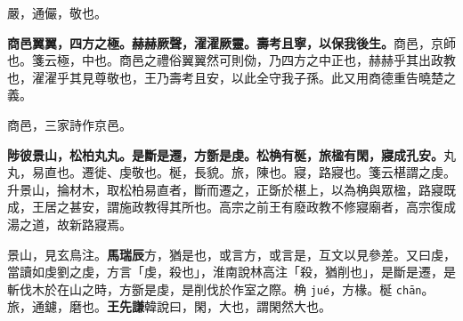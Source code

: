 \begin{quoting}嚴，通儼，敬也。\end{quoting}

\textbf{商邑翼翼，四方之極。赫赫厥聲，濯濯厥靈。壽考且寧，以保我後生。}{\footnotesize 商邑，京師也。箋云極，中也。商邑之禮俗翼翼然可則俲，乃四方之中正也，赫赫乎其出政教也，濯濯乎其見尊敬也，王乃壽考且安，以此全守我子孫。此又用商德重告曉楚之義。}

\begin{quoting}商邑，三家詩作京邑。\end{quoting}

\textbf{陟彼景山，松柏丸丸。是斷是遷，方斵是虔。松桷有梴，旅楹有閑，寢成孔安。}{\footnotesize 丸丸，易直也。遷徙、虔敬也。梴，長貌。旅，陳也。寢，路寢也。箋云椹謂之虔。升景山，掄材木，取松柏易直者，斷而遷之，正斲於椹上，以為桷與眾楹，路寢既成，王居之甚安，謂施政教得其所也。高宗之前王有廢政教不修寢廟者，高宗復成湯之道，故新路寢焉。}

\begin{quoting}景山，見玄鳥注。\textbf{馬瑞辰}方，猶是也，或言方，或言是，互文以見參差。又曰虔，當讀如虔劉之虔，方言「虔，殺也」，淮南說林高注「殺，猶削也」，是斷是遷，是斬伐木於在山之時，方斵是虔，是削伐於作室之際。桷 \texttt{jué}，方椽。梴 \texttt{chān}。旅，通鑢，磨也。\textbf{王先謙}韓說曰，閑，大也，謂閑然大也。\end{quoting}

